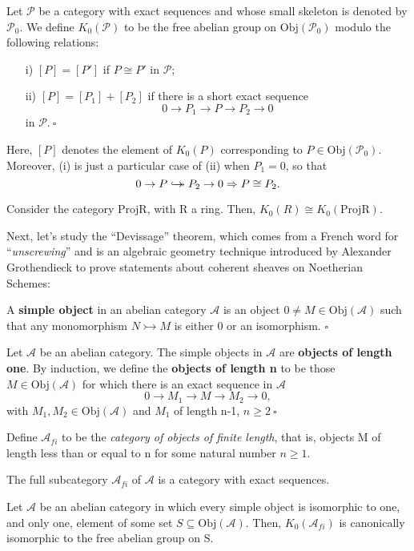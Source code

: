 \documentclass[../category_theory.tex]{subfiles}
\begin{document}
\begin{def*}
	Let \(\mathcal{P}\) be a category with exact sequences and whose small skeleton is denoted by \(\mathcal{P}_{0}\). We define \(K_{0}(\mathcal{P})\) to be the free abelian group on \(\mathrm{Obj}(\mathcal{P}_{0})\) modulo the following relations:
	\begin{itemize}
		\item[i)] \([P]=[P']\) if \(P\cong P'\) in \(\mathcal{P}\);
		\item[ii)] \([P]=[P_{1}]+[P_{2}]\) if there is a short exact sequence
		      \[
			      0\rightarrow P_{1}\rightarrow P\rightarrow P_{2}\rightarrow 0
		      \]
		      in \(\mathcal{P}.\:\square\)
	\end{itemize}
\end{def*}
Here, \([P]\) denotes the element of \(K_{0}(P)\) corresponding to \(P\in \mathrm{Obj}(\mathcal{P}_{0})\). Moreover, (i) is just a particular case of (ii) when \(P_{1} = 0\), so that
\[
	0\rightarrow P \hookrightarrow\mathrel{\mspace{-15mu}}\twoheadrightarrow P_{2}\rightarrow 0 \Rightarrow P\cong P_{2}.
\]
\begin{theorem*}
	Consider the category \(\mathrm{ProjR}\), with R a ring. Then, \(K_{0}(R)\cong K_{0}(\mathrm{Proj R})\).
\end{theorem*}
Next, let's study the ``Devissage'' theorem, which comes from a French word for ``\textit{unscrewing}'' and is an algebraic geometry technique introduced by Alexander Grothendieck to prove statements about coherent sheaves on Noetherian Schemes:
\begin{def*}
	A \textbf{simple object} in an abelian category \(\mathcal{A}\)  is an object \(0\neq M\in \mathrm{Obj}(\mathcal{A})\) such that any monomorphism \(N\rightarrowtail M\) is either 0 or an isomorphism. \(\square\)
\end{def*}
\begin{def*}
	Let \(\mathcal{A}\) be an abelian category. The simple objects in \(\mathcal{A}\) are \textbf{objects of length one}. By induction, we define the \textbf{objects of length n} to be those \(M\in \mathrm{Obj}(\mathcal{A})\) for which there is an exact sequence in \(\mathcal{A}\)
	\[
		0\rightarrow M_{1}\rightarrow M\rightarrow M_{2}\rightarrow 0,
	\]
	with \(M_{1}, M_{2}\in \mathrm{Obj}(\mathcal{A})\) and \(M_{1}\) of length n-1, \(n\geq 2\: \square\)
\end{def*}
Define \(\mathcal{A}_{fi}\) to be the \textit{category of objects of finite length}, that is, objects M of length less than or equal to n for some natural number \(n\geq 1\).
\begin{prop*}
	The full subcategory \(\mathcal{A}_{fi}\) of \(\mathcal{A}\) is a category with exact sequences.
\end{prop*}
\begin{theorem*}[``Devissage'']
	Let \(\mathcal{A}\) be an abelian category in which every simple object is isomorphic to one, and only one, element of some set \(S\subseteq \mathrm{Obj}(\mathcal{A})\). Then, \(K_{0}(\mathcal{A}_{fi})\) is canonically isomorphic to the free abelian group on S.
\end{theorem*}
\end{document}
